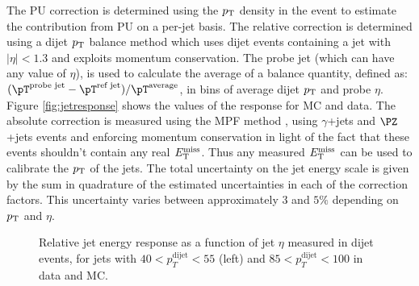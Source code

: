 The \ac{PU} correction is determined using the $p_{\mathrm{T}}$ density in the event to
estimate the contribution from \ac{PU} on a per-jet basis. The relative
correction is determined using a dijet $p_{\mathrm{T}}$ balance method which uses dijet
events containing a jet with $|\eta| < 1.3$ and exploits momentum conservation.
The probe jet (which can have any value of $\eta$), is used to calculate the
average of a balance quantity, defined as:
$(\pT^{\text{probe jet}}-\pT^{\text{ref jet}})/\pT^{\text{average}}$, in bins of
average dijet $p_{\mathrm{T}}$ and probe $\eta$. Figure \ref{fig:jetresponse} shows the
values of the response for \ac{MC} and data. The absolute correction is measured
using the \ac{MPF} method \cite{Abe:1992sj}, using $\gamma$+jets and $\PZ$+jets
events and enforcing momentum conservation in light of the fact that these
events shouldn't contain any real $E_{\mathrm{T}}^{\text{miss}}$. Thus any measured $E_{\mathrm{T}}^{\text{miss}}$ can be used to
calibrate the $p_{\mathrm{T}}$ of the jets. The total uncertainty on the jet energy scale
is given by the sum in quadrature of the estimated uncertainties in each of the
correction factors. This uncertainty varies between approximately $3$ and $5\%$
depending on $p_{\mathrm{T}}$ and $\eta$. 

\begin{figure}
\begin{center}

\end{center}
\caption{
Relative jet energy response as a function of jet $\eta$ measured in dijet
events, for jets with $40 < p_{T}^{\text{dijet}} < 55$ (left) and 
$85 < p_{T}^{\text{dijet}} < 100$ in data and MC.       
}
\label{fig:jesresponse}
\end{figure}


